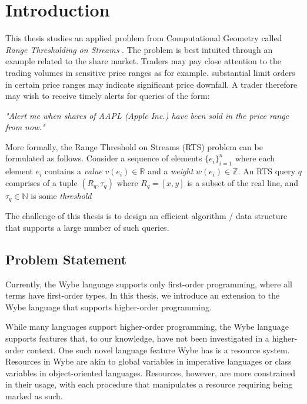 \clearpage

\def\chaptertitle{Introduction}

\lhead{\emph{\chaptertitle}}

\chapter{\chaptertitle}
\label{ch:introduction}

This thesis studies an applied problem from Computational Geometry called \textit{Range Thresholding on Streams} \cite{GAN16}. The problem is best intuited through an example related to the share market. Traders may pay close attention to the trading volumes in sensitive price ranges as for example. substantial limit orders in certain price ranges may indicate significant price downfall. A trader therefore may wish to receive timely alerts for queries of the form: 

\textit{"Alert me when  shares of AAPL (Apple Inc.) have been sold in the price range \text{[200, 205]} from now."}

More formally, the Range Threshold on Streams (RTS) problem can be formulated as follows. Consider a sequence of elements $\{e_i\}^{n}_{i=1}$ where each element $e_i$ contains a \textit{value} $v(e_i) \in \mathbb{R}$ and a \textit{weight} $w(e_i) \in \mathbb{Z}$. An RTS query $q$ comprises of a tuple $(R_q, \tau_q)$ where $R_q = [x,y]$ is a subset of the real line, and $\tau_q \in\mathbb{N}$ is some \textit{threshold}

The challenge of this thesis is to design an efficient algorithm / data structure that supports a large number of such queries. 

\section{Problem Statement}
\label{sec:problem-statement}




Currently, the Wybe language supports only first-order programming, where all terms have first-order types. In this thesis, we introduce an extension to the Wybe language that supports higher-order programming.

While many languages support higher-order programming, the Wybe language supports features that, to our knowledge, have not been investigated in a higher-order context. One such novel language feature Wybe has is a resource system. Resources in Wybe are akin to global variables in imperative languages or class variables in object-oriented languages. Resources, however, are more constrained in their usage, with each procedure that manipulates a resource requiring being marked as such. 

